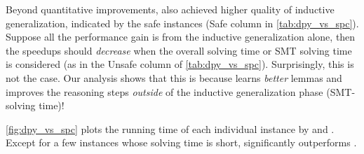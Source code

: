 Beyond quantitative improvements, \dpy also achieved higher quality of inductive generalization, indicated by the safe instances (Safe column in \cref{tab:dpy_vs_spc}). 
Suppose all the performance gain is from the inductive generalization alone, then the speedups should \emph{decrease} when the overall solving time or SMT solving time is considered (as in the Unsafe column of \cref{tab:dpy_vs_spc}). Surprisingly, this is not the case. 
Our analysis shows that this is because \dpy learns \emph{better} lemmas and improves the reasoning steps \emph{outside} of the inductive generalization phase (SMT-solving time)! %
%
    


\cref{fig:dpy_vs_spc} plots the running time of each individual instance by \dpy and \spc. Except for a few instances whose solving time is short, \dpy significantly outperforms \spc.

